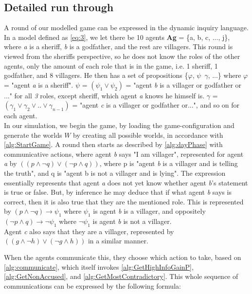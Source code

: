 \subsection{Detailed run through}\label{sec:ARoundOfTheGame}
A round of our modelled game can be expressed in the dynamic inquiry language.
In a model defined as \cref{eq:3}, we let there be 10 agents \textbf{Ag} = \{a,
b, c, ..., j\}, where \textit{a} is a sheriff, \textit{b} is a godfather, and
the rest are villagers. This round is viewed from the sheriffs perspective, so
he does not know the roles of the other agents, only the amount of each role
that is in the game, i.e. 1 sheriff, 1 godfather, and 8 villagers. He then has
a set of propositions \{$\varphi$, $\psi$\, $\gamma$, ...\} where $\varphi$ =
"agent \textit{a} is a sheriff". $\psi$ = $(\psi_1 \lor \psi_2)$ = "agent
\textit{b} is a villager or godfather or ..." for all \textit{3} roles, except
sheriff, which agent \textit{a} knows he himself is. $\gamma$ = $(\gamma_1 \lor
	\gamma_2 \lor .. \lor \gamma_{n-1}) $ = "agent \textit{c} is a villager or
godfather or...", and so on for each agent. \\ In our simulation, we begin the game, by loading the game-configuration and generate the worlds
$W$ by creating all possible worlds, in accordance with \cref{alg:StartGame}. A round then
starts as described by \cref{alg:dayPhase} with communicative actions, where agent \textit{b} says "I am villager",
represented for agent \textit{a} by $((p \land \neg q) \lor (\neg p \land q))$, where p is "agent \textit{b} is a villager and is telling the truth",
and q is "agent b is not a villager and is lying". The expression essentially represents that agent \textit{a} does not yet know whether
agent \textit{b}'s statement is true or false. But, by inference he may deduce
that if what agent \textit{b} says is correct, then it is also true that they
are the mentioned role. This is represented by $(p \land \neg q) \rightarrow
	\psi_1$ where $\psi_1$ is agent \textit{b} is a villager, and oppositely $(\neg
	p \land q) \rightarrow \neg \psi_1$ where $\neg \psi_1$ is agent \textit{b} is
not a villager. \\ Agent \textit{c} also says that they are a villager,
represented by $((g \land \neg h) \lor (\neg g \land h))$ in a similar manner.

When the agents communicate this, they choose which action to take, based on \cref{alg:communicate}, which itself invokes \cref{alg:GetHighInfoGainP},  \cref{alg:GetNonAccused}, and \cref{alg:GetMostContradictory}.
This whole sequence of communications can be expressed by the following formula:

